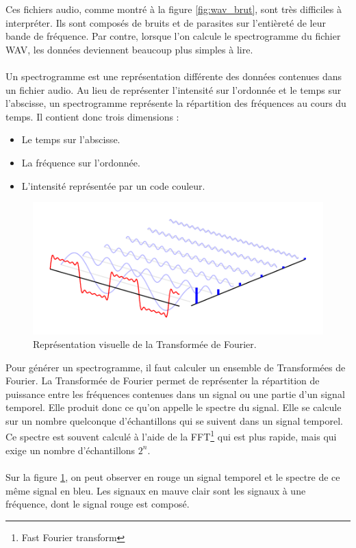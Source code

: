\documentclass[11pt]{article}
\begin{document}
Ces fichiers audio, comme montré à la figure \ref{fig:wav_brut}, sont très difficiles à interpréter.
Ils sont composés de bruits et de parasites sur l'entièreté de leur bande de fréquence.
Par contre, lorsque l'on calcule le spectrogramme du fichier WAV, les données deviennent beaucoup plus simples à lire.
\\
\\
Un spectrogramme est une représentation différente des données contenues dans un fichier audio.
Au lieu de représenter l'intensité sur l'ordonnée et le temps sur l'abscisse, un spectrogramme représente la répartition des fréquences au cours du temps.
Il contient donc trois dimensions :
\begin{itemize}
    \item Le temps sur l'abscisse.
    \item La fréquence sur l'ordonnée.
    \item L'intensité représentée par un code couleur.\\
\end{itemize}

\begin{figure}[h]
    \begin{center}
        \includegraphics[scale=0.7]{spectre.png}
        \caption{Représentation visuelle de la Transformée de Fourier.}
        \label{fig:expl_fourier}
    \end{center}
\end{figure}

Pour générer un spectrogramme, il faut calculer un ensemble de Transformées de Fourier.
La Transformée de Fourier permet de représenter la répartition de puissance entre les fréquences contenues dans un signal ou une partie d'un signal temporel.
Elle produit donc ce qu'on appelle le spectre du signal.
Elle se calcule sur un nombre quelconque d'échantillons qui se suivent dans un signal temporel.
Ce spectre est souvent calculé à l'aide de la FFT\footnote{Fast Fourier transform} qui est plus rapide, mais qui exige un nombre d'échantillons $2^{n}$.\\
\\
Sur la figure \ref{fig:expl_fourier}, on peut observer en rouge un signal temporel et le spectre de ce même signal en bleu.
Les signaux en mauve clair sont les signaux à une fréquence, dont le signal rouge est composé.
\end{document}
